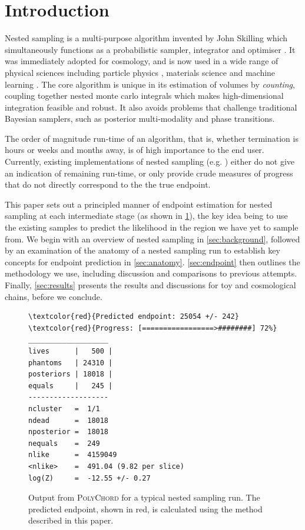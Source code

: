 \documentclass[usenatbib]{mnras}
\begin{document}
\section{Introduction}
Nested sampling is a multi-purpose algorithm invented by John Skilling which simultaneously functions as a probabilistic sampler, integrator and optimiser \citep{skilling}. It was immediately adopted for cosmology, and is now used in a wide range of physical sciences including particle physics \citep{Trotta_2008}, materials science \citep{materials} and machine learning \citep{sparse_reconstruction}. The core algorithm is unique in its estimation of volumes by \textit{counting}, coupling together nested monte carlo integrals which makes high-dimensional integration feasible and robust. It also avoids problems that challenge traditional Bayesian samplers, such as posterior multi-modality and phase transitions.
\par
The order of magnitude run-time of an algorithm, that is, whether termination is hours or weeks and months away, is of high importance to the end user. Currently, existing implementations of nested sampling (e.g. \citealt{multinest, polychord, dnest, dynesty, ultranest, nessai,proxnest}) either do not give an indication of remaining run-time, or only provide crude measures of progress that do not directly correspond to the the true endpoint.
\par
This paper sets out a principled manner of endpoint estimation for nested sampling at each intermediate stage (as shown in \cref{fig:polychord_output}), the key idea being to use the existing samples to predict the likelihood in the region we have yet to sample from. We begin with an overview of nested sampling in \cref{sec:background}, followed by an examination of the anatomy of a nested sampling run to establish key concepts for endpoint prediction in \cref{sec:anatomy}. \cref{sec:endpoint} then outlines the methodology we use, including discussion and comparisons to previous attempts. Finally, \cref{sec:results} presents the results and discussions for toy and cosmological chains, before we conclude.
\begin{figure}
\begin{Verbatim}[frame=single, commandchars=\\\{\}]
\textcolor{red}{Predicted endpoint: 25054 +/- 242}
\textcolor{red}{Progress: [=================>########] 72%}
___________________
lives      |   500 |
phantoms   | 24310 |
posteriors | 18018 |
equals     |   245 |
-------------------
ncluster   =  1/1
ndead      =  18018
nposterior =  18018
nequals    =  249
nlike      =  4159049
<nlike>    =  491.04 (9.82 per slice)
log(Z)     =  -12.55 +/- 0.27
\end{Verbatim}
\caption{Output from \textsc{PolyChord} for a typical nested sampling run. The predicted endpoint, shown in red, is calculated using the method described in this paper.}
\label{fig:polychord_output}
\end{figure}
\end{document}

